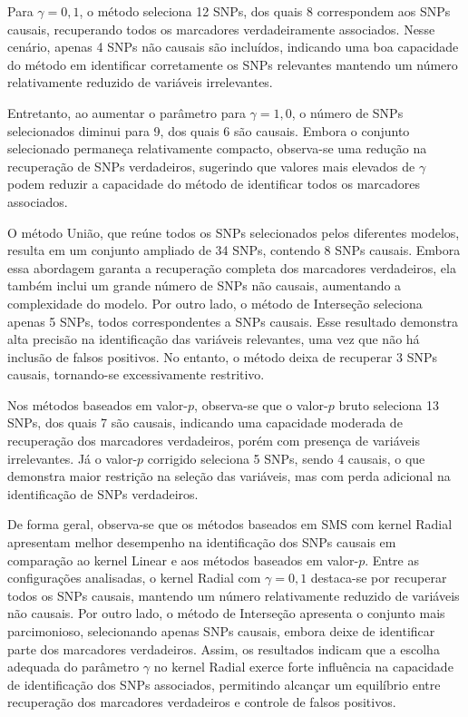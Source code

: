 \documentclass[12pt,a4paper]{article}
\begin{document}
Para $\gamma = 0{,}1$, o método seleciona 12 SNPs, dos quais 8 correspondem aos SNPs causais, recuperando todos os marcadores verdadeiramente associados. Nesse cenário, apenas 4 SNPs não causais são incluídos, indicando uma boa capacidade do método em identificar corretamente os SNPs relevantes mantendo um número relativamente reduzido de variáveis irrelevantes.

Entretanto, ao aumentar o parâmetro para $\gamma = 1{,}0$, o número de SNPs selecionados diminui para 9, dos quais 6 são causais. Embora o conjunto selecionado permaneça relativamente compacto, observa-se uma redução na recuperação de SNPs verdadeiros, sugerindo que valores mais elevados de $\gamma$ podem reduzir a capacidade do método de identificar todos os marcadores associados.

O método União, que reúne todos os SNPs selecionados pelos diferentes modelos, resulta em um conjunto ampliado de 34 SNPs, contendo 8 SNPs causais. Embora essa abordagem garanta a recuperação completa dos marcadores verdadeiros, ela também inclui um grande número de SNPs não causais, aumentando a complexidade do modelo. Por outro lado, o método de Interseção seleciona apenas 5 SNPs, todos correspondentes a SNPs causais. Esse resultado demonstra alta precisão na identificação das variáveis relevantes, uma vez que não há inclusão de falsos positivos. No entanto, o método deixa de recuperar 3 SNPs causais, tornando-se excessivamente restritivo.

Nos métodos baseados em valor-$p$, observa-se que o valor-$p$ bruto seleciona 13 SNPs, dos quais 7 são causais, indicando uma capacidade moderada de recuperação dos marcadores verdadeiros, porém com presença de variáveis irrelevantes. Já o valor-$p$ corrigido seleciona 5 SNPs, sendo 4 causais, o que demonstra maior restrição na seleção das variáveis, mas com perda adicional na identificação de SNPs verdadeiros.

De forma geral, observa-se que os métodos baseados em SMS com kernel Radial apresentam melhor desempenho na identificação dos SNPs causais em comparação ao kernel Linear e aos métodos baseados em valor-$p$. Entre as configurações analisadas, o kernel Radial com $\gamma = 0{,}1$ destaca-se por recuperar todos os SNPs causais, mantendo um número relativamente reduzido de variáveis não causais. Por outro lado, o método de Interseção apresenta o conjunto mais parcimonioso, selecionando apenas SNPs causais, embora deixe de identificar parte dos marcadores verdadeiros. Assim, os resultados indicam que a escolha adequada do parâmetro $\gamma$ no kernel Radial exerce forte influência na capacidade de identificação dos SNPs associados, permitindo alcançar um equilíbrio entre recuperação dos marcadores verdadeiros e controle de falsos positivos.
\end{document}
